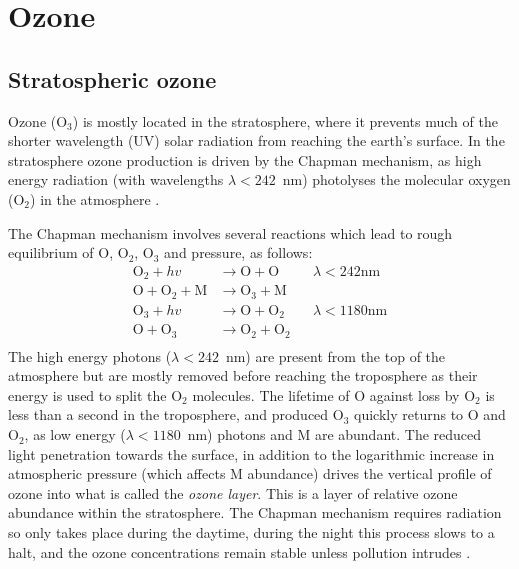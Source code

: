       

\section{Ozone}
\label{LR:O3}
  
  \subsection{Stratospheric ozone}
    Ozone (O$_3$) is mostly located in the stratosphere, where it prevents much of the shorter wavelength (UV) solar radiation from reaching the earth's surface.
    In the stratosphere ozone production is driven by the Chapman mechanism, as high energy radiation (with wavelengths $\lambda<242$~nm) photolyses the molecular oxygen (O$_2$) in the atmosphere \parencite[][Chapter 3, section 2]{BrasseurJacob2017}.
    
    The Chapman mechanism involves several reactions which lead to rough equilibrium of O, O$_2$, O$_3$ and pressure, as follows:
    \begin{equation}
      \begin{aligned}
        \text{O}_2 + hv              & \to \text{O}+\text{O}     && \lambda < 242 \text{nm} \\
        \text{O}+\text{O}_2+\text{M} & \to \text{O}_3+\text{M}   &&    \\
        \text{O}_3 + hv              & \to \text{O}+\text{O}_2   && \lambda < 1180 \text{nm} \\
        \text{O} + \text{O}_3        & \to \text{O}_2+\text{O}_2 &&       \\
      \end{aligned}
      \label{LR:O3:eqn_Chapman}
    \end{equation}
    The high energy photons ($\lambda < 242$~nm) are present from the top of the atmosphere but are mostly removed before reaching the troposphere as their energy is used to split the O$_2$ molecules.
    The lifetime of O against loss by O$_2$ is less than a second in the troposphere, and produced O$_3$ quickly returns to O and O$_2$, as low energy ($\lambda < 1180$~nm) photons and M are abundant.
    The reduced light penetration towards the surface, in addition to the logarithmic increase in atmospheric pressure (which affects M abundance) drives the vertical profile of ozone into what is called the \textit{ozone layer}.
    This is a layer of relative ozone abundance within the stratosphere.
    The Chapman mechanism requires radiation so only takes place during the daytime, during the night this process slows to a halt, and the ozone concentrations remain stable unless pollution intrudes \parencite[Chapter 10]{Jacob_1999_book}.
  
